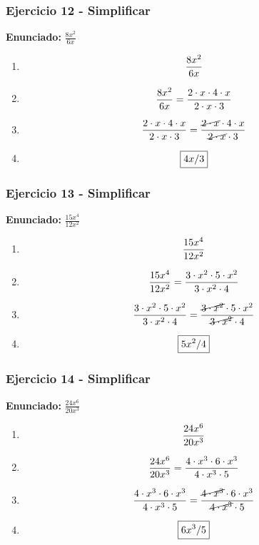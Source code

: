 \documentclass[11pt,a4paper]{article}
\newcommand{\fitmath}[1]{%
\[
\setbox0=\hbox{$\displaystyle #1$}%
\ifdim\wd0>\linewidth
\resizebox{\linewidth}{!}{$\displaystyle #1$}%
\else
#1%
\fi
\]
}
\begin{document}
\vspace{0.12cm}
\subsubsection*{Ejercicio 12 - Simplificar}
\textbf{Enunciado:} $ \frac{8 x^{2}}{6 x} $\par
\begin{enumerate}[leftmargin=2em]
\item \fitmath{\frac{8 x^{2}}{6 x}}
\item \fitmath{\frac{8 x^{2}}{6 x}=\frac{2\cdot x\cdot 4\cdot x}{2\cdot x\cdot 3}}
\item \fitmath{\frac{2\cdot x\cdot 4\cdot x}{2\cdot x\cdot 3}=\frac{\cancel{2\cdot x}\cdot 4\cdot x}{\cancel{2\cdot x}\cdot 3}}
\item \fitmath{\boxed{4 x / 3}}
\end{enumerate}

\vspace{0.12cm}
\subsubsection*{Ejercicio 13 - Simplificar}
\textbf{Enunciado:} $ \frac{15 x^{4}}{12 x^{2}} $\par
\begin{enumerate}[leftmargin=2em]
\item \fitmath{\frac{15 x^{4}}{12 x^{2}}}
\item \fitmath{\frac{15 x^{4}}{12 x^{2}}=\frac{3\cdot x^{2}\cdot 5\cdot x^{2}}{3\cdot x^{2}\cdot 4}}
\item \fitmath{\frac{3\cdot x^{2}\cdot 5\cdot x^{2}}{3\cdot x^{2}\cdot 4}=\frac{\cancel{3\cdot x^{2}}\cdot 5\cdot x^{2}}{\cancel{3\cdot x^{2}}\cdot 4}}
\item \fitmath{\boxed{5 x^{2} / 4}}
\end{enumerate}

\vspace{0.12cm}
\subsubsection*{Ejercicio 14 - Simplificar}
\textbf{Enunciado:} $ \frac{24 x^{6}}{20 x^{3}} $\par
\begin{enumerate}[leftmargin=2em]
\item \fitmath{\frac{24 x^{6}}{20 x^{3}}}
\item \fitmath{\frac{24 x^{6}}{20 x^{3}}=\frac{4\cdot x^{3}\cdot 6\cdot x^{3}}{4\cdot x^{3}\cdot 5}}
\item \fitmath{\frac{4\cdot x^{3}\cdot 6\cdot x^{3}}{4\cdot x^{3}\cdot 5}=\frac{\cancel{4\cdot x^{3}}\cdot 6\cdot x^{3}}{\cancel{4\cdot x^{3}}\cdot 5}}
\item \fitmath{\boxed{6 x^{3} / 5}}
\end{enumerate}
\end{document}
